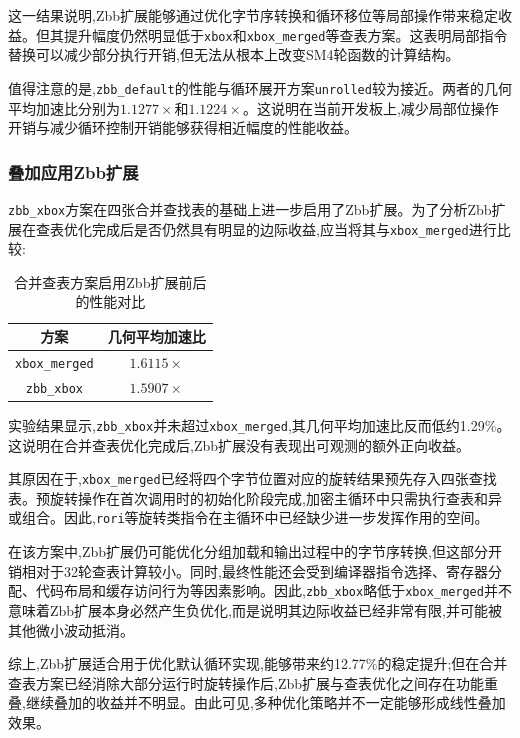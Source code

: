 这一结果说明,Zbb扩展能够通过优化字节序转换和循环移位等局部操作带来稳定收益。但其提升幅度仍然明显低于\texttt{xbox}和\texttt{xbox\_merged}等查表方案。这表明局部指令替换可以减少部分执行开销,但无法从根本上改变SM4轮函数的计算结构。

值得注意的是,\texttt{zbb\_default}的性能与循环展开方案\texttt{unrolled}较为接近。两者的几何平均加速比分别为$1.1277\times$和$1.1224\times$。这说明在当前开发板上,减少局部位操作开销与减少循环控制开销能够获得相近幅度的性能收益。

\subsubsection{叠加应用Zbb扩展}

\texttt{zbb\_xbox}方案在四张合并查找表的基础上进一步启用了Zbb扩展。为了分析Zbb扩展在查表优化完成后是否仍然具有明显的边际收益,应当将其与\texttt{xbox\_merged}进行比较:

\begin{table}[H]
    \centering
    \caption{合并查表方案启用Zbb扩展前后的性能对比}
    \label{tab:zbb-combined}
    \begin{tabular}{c|c}
        \toprule
        方案 & 几何平均加速比 \\
        \midrule
        \texttt{xbox\_merged} & $1.6115\times$ \\
        \texttt{zbb\_xbox} & $1.5907\times$ \\
        \bottomrule
    \end{tabular}
\end{table}

实验结果显示,\texttt{zbb\_xbox}并未超过\texttt{xbox\_merged},其几何平均加速比反而低约1.29\%。这说明在合并查表优化完成后,Zbb扩展没有表现出可观测的额外正向收益。

其原因在于,\texttt{xbox\_merged}已经将四个字节位置对应的旋转结果预先存入四张查找表。预旋转操作在首次调用时的初始化阶段完成,加密主循环中只需执行查表和异或组合。因此,\texttt{rori}等旋转类指令在主循环中已经缺少进一步发挥作用的空间。

在该方案中,Zbb扩展仍可能优化分组加载和输出过程中的字节序转换,但这部分开销相对于32轮查表计算较小。同时,最终性能还会受到编译器指令选择、寄存器分配、代码布局和缓存访问行为等因素影响。因此,\texttt{zbb\_xbox}略低于\texttt{xbox\_merged}并不意味着Zbb扩展本身必然产生负优化,而是说明其边际收益已经非常有限,并可能被其他微小波动抵消。

综上,Zbb扩展适合用于优化默认循环实现,能够带来约12.77\%的稳定提升;但在合并查表方案已经消除大部分运行时旋转操作后,Zbb扩展与查表优化之间存在功能重叠,继续叠加的收益并不明显。由此可见,多种优化策略并不一定能够形成线性叠加效果。



